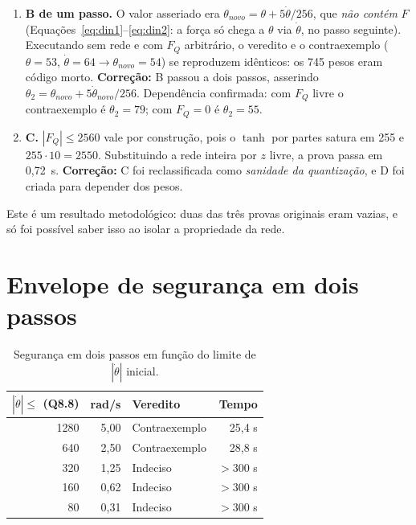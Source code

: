 \documentclass[12pt,openright,oneside,a4paper,chapter=TITLE,sumario=tradicional,english,brazil]{abntex2}
\begin{document}
\begin{enumerate}
  \item \textbf{B de um passo.} O valor asseriado era $\theta_{novo}=\theta+5\dot\theta/256$, que \emph{não contém} $F$ (Equações~\ref{eq:din1}--\ref{eq:din2}: a força só chega a $\theta$ via $\dot\theta$, no passo seguinte). Executando sem rede e com $F_Q$ arbitrário, o veredito e o contraexemplo ($\theta=53$, $\dot\theta=64\to\theta_{novo}=54$) se reproduzem idênticos: os 745 pesos eram código morto. \textbf{Correção:} B passou a dois passos, asserindo $\theta_2=\theta_{novo}+5\dot\theta_{novo}/256$. Dependência confirmada: com $F_Q$ livre o contraexemplo é $\theta_2=79$; com $F_Q=0$ é $\theta_2=55$.
  \item \textbf{C.} $|F_Q|\le2560$ vale por construção, pois o $\tanh$ por partes satura em 255 e $255\cdot10=2550$. Substituindo a rede inteira por $z$ livre, a prova passa em 0,72~s. \textbf{Correção:} C foi reclassificada como \emph{sanidade da quantização}, e D foi criada para depender dos pesos.
\end{enumerate}

Este é um resultado metodológico: duas das três provas originais eram vazias, e só foi possível saber isso ao isolar a propriedade da rede.

\section{Envelope de segurança em dois passos}\label{sec:envelope}

\begin{table}[htb]
\caption{Segurança em dois passos em função do limite de $|\dot\theta|$ inicial.}\label{tab:env}
\centering
\begin{tabular}{r|r|l|r}
\toprule
$|\dot\theta|\le$ (Q8.8) & rad/s & Veredito & Tempo \\
\midrule
1280 & 5,00 & Contraexemplo & 25,4 s \\
 640 & 2,50 & Contraexemplo & 28,8 s \\
 320 & 1,25 & Indeciso & $>$300 s \\
 160 & 0,62 & Indeciso & $>$300 s \\
  80 & 0,31 & Indeciso & $>$300 s \\
\bottomrule
\end{tabular}
\end{table}
\end{document}
